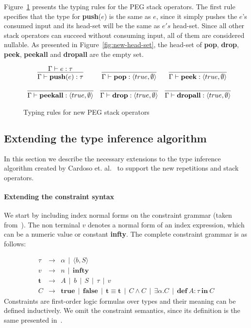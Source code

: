 \documentclass[preprint,12pt]{elsarticle}
\theoremstyle{definition}
\begin{document}
Figure~\ref{fig:typing-stack} presents the typing rules for the PEG stack
operators. The first rule specifies that the type for \textbf{push}($e$) is
the same as $e$, since it simply pushes the $e$'s consumed input and its
head-set will be the same as $e's$ head-set. Since all other stack operators
can succeed without consuming input, all of them are considered nullable.
As presented in Figure~\ref{fig:new-head-set}, the head-set of \textbf{pop},
\textbf{drop}, \textbf{peek}, \textbf{peekall} and \textbf{dropall} are the
empty set.

\begin{figure}[H]
  \[
    \begin{array}{ccc}
      \infer{\Gamma \vdash \mathbf{push}(e) : \tau}
            {\Gamma \vdash e : \tau}
      &
      \infer{\Gamma \vdash \mathbf{pop} : \langle true, \emptyset\rangle}{} &
      \infer{\Gamma \vdash \mathbf{peek} : \langle true, \emptyset\rangle}{} \\ & \\
      \infer{\Gamma \vdash \mathbf{peekall} : \langle true, \emptyset\rangle}{} &
      \infer{\Gamma \vdash \mathbf{drop} : \langle true, \emptyset\rangle}{} &
      \infer{\Gamma \vdash \mathbf{dropall} : \langle true, \emptyset\rangle}{}
    \end{array}
  \]
  \caption{Typing rules for new PEG stack operators}
  \label{fig:typing-stack}
\end{figure}

\subsection{Extending the type inference algorithm}

In this section we describe the necessary extensions to the type inference algorithm
created by Cardoso et. al.~\cite{Cardoso23} to support the new repetitions and
stack operators.

\paragraph{Extending the constraint syntax} We start by including index normal forms
on the constraint grammar (taken from~\cite{Cardoso23}). The non terminal $v$ denotes
a normal form of an index expression, which can be a numeric value or
constant \textbf{infty}. The complete constraint grammar is as follows:

  \[
    \begin{array}{lcl}
      \tau & \to & \alpha\,\mid\,\langle b, S \rangle\\
      v & \to & n\,\mid\,\mathbf{infty}\\
      \mathbf{t} & \to & A\,\mid\,b\,\mid\,S\,\mid\,\tau\,\mid\,v\\
      C    & \to & \mathbf{true}\,\mid\,\mathbf{false}\,\mid\,\mathbf{t} \equiv \mathbf{t}\,\mid\,C \land C\,\mid\, \exists
                   \alpha.C\,\mid\, \mathbf{def}\:A :\tau\:\mathbf{in}\:C
    \end{array}
  \]
Constraints are first-order logic formulas over types and their meaning
can be defined inductively. We omit the constraint semantics, since its
definition is the same presented in~\cite{Cardoso23}.
\end{document}
